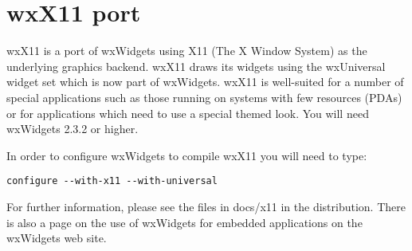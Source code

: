 \section{wxX11 port}\label{wxx11port}

wxX11 is a port of wxWidgets using X11 (The X Window System)
as the underlying graphics backend. wxX11 draws its widgets
using the wxUniversal widget set which is now part of wxWidgets.
wxX11 is well-suited for a number of special applications such
as those running on systems with few resources (PDAs) or for
applications which need to use a special themed look. You will need
wxWidgets 2.3.2 or higher.

In order to configure wxWidgets to compile wxX11 you will 
need to type:

\begin{verbatim}
configure --with-x11 --with-universal
\end{verbatim}

For further information, please see the files in docs/x11
in the distribution. There is also a page on the use of
wxWidgets for embedded applications on the wxWidgets web site.

